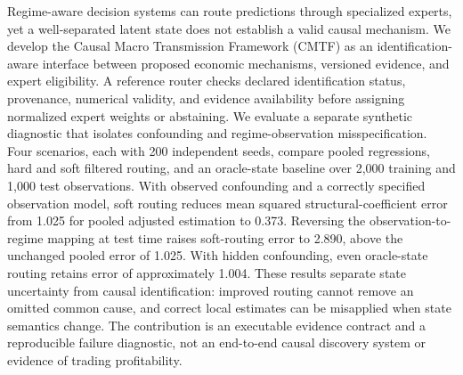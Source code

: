 Regime-aware decision systems can route predictions through specialized experts, yet a well-separated latent state does not establish a valid causal mechanism. We develop the Causal Macro Transmission Framework (CMTF) as an identification-aware interface between proposed economic mechanisms, versioned evidence, and expert eligibility. A reference router checks declared identification status, provenance, numerical validity, and evidence availability before assigning normalized expert weights or abstaining. We evaluate a separate synthetic diagnostic that isolates confounding and regime-observation misspecification. Four scenarios, each with 200 independent seeds, compare pooled regressions, hard and soft filtered routing, and an oracle-state baseline over 2,000 training and 1,000 test observations. With observed confounding and a correctly specified observation model, soft routing reduces mean squared structural-coefficient error from 1.025 for pooled adjusted estimation to 0.373. Reversing the observation-to-regime mapping at test time raises soft-routing error to 2.890, above the unchanged pooled error of 1.025. With hidden confounding, even oracle-state routing retains error of approximately 1.004. These results separate state uncertainty from causal identification: improved routing cannot remove an omitted common cause, and correct local estimates can be misapplied when state semantics change. The contribution is an executable evidence contract and a reproducible failure diagnostic, not an end-to-end causal discovery system or evidence of trading profitability.